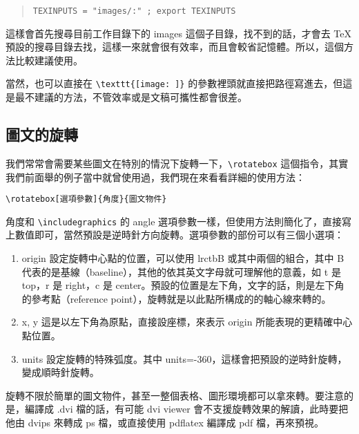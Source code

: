 \begin{quote}
  \begin{verbatim}
TEXINPUTS = "images/:" ; export TEXINPUTS
\end{verbatim}
\end{quote}

這樣會首先搜尋目前工作目錄下的 {\ttfamily images} 這個子目錄，找不到的話，才會去 \TeX{} 預設的搜尋目錄去找，這樣一來就會很有效率，而且會較省記憶體。所以，這個方法比較建議使用。

當然，也可以直接在 \verb|\texttt{[image: ]}| 的參數裡頭就直接把路徑寫進去，但這是最不建議的方法，不管效率或是文稿可攜性都會很差。

\subsection{圖文的旋轉}
\label{subsec:rotate}

我們常常會需要某些圖文在特別的情況下旋轉一下，\verb|\rotatebox| 這個指令，其實我們前面舉的例子當中就曾使用過，我們現在來看看詳細的使用方法：

\verb|\rotatebox[選項參數]{角度}{圖文物件}|

角度和 \verb|\includegraphics| 的 angle 選項參數一樣，但使用方法則簡化了，直接寫上數值即可，當然預設是逆時針方向旋轉。選項參數的部份可以有三個小選項：

\begin{enumerate}

  \item origin \newline
        設定旋轉中心點的位置，可以使用 {\ttfamily lrctbB} 或其中兩個的組合，其中 {\ttfamily B} 代表的是基線（baseline），其他的依其英文字母就可理解他的意義，如 {\ttfamily t} 是 top，{\ttfamily r} 是 right，{\ttfamily c} 是 center。預設的位置是左下角，文字的話，則是左下角的參考點（reference point），旋轉就是以此點所構成的的軸心線來轉的。

  \item x, y \newline
        這是以左下角為原點，直接設座標，來表示 origin 所能表現的更精確中心點位置。

  \item units \newline
        設定旋轉的特殊弧度。其中 {\ttfamily units=-360}，這樣會把預設的逆時針旋轉，變成順時針旋轉。

\end{enumerate}

旋轉不限於簡單的圖文物件，甚至一整個表格、圖形環境都可以拿來轉。要注意的是，編譯成 {\ttfamily *.dvi} 檔的話，有可能 dvi viewer 會不支援旋轉效果的解讀，此時要把他由 {\ttfamily dvips} 來轉成 ps 檔，或直接使用 {\ttfamily pdflatex} 編譯成 pdf 檔，再來預視。

